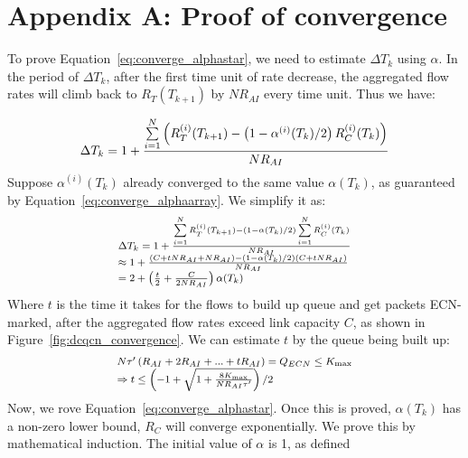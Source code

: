 \section*{Appendix A: Proof of convergence}
\label{sec:alpha_proof}
To prove Equation~\ref{eq:converge_alphastar}, we need to estimate $\Delta T_k$
using $\alpha$. In the period of $\Delta T_k$, after the first time unit of rate
decrease, the aggregated flow rates will climb back to $R_T(T_{k+1})$ by
$NR_{AI}$ every time unit.  Thus we have:

\begin{equation}
\small\Delta {T_k} = 1 + \frac{{\sum\limits_{i = 1}^N {\left( {R_T^{(i)}({T_{k + 1}}) - \left( {1 - {\alpha ^{(i)}}({T_k})/2} \right)R_C^{(i)}({T_k})} \right)} }}{{N{R_{AI}}}}
\end{equation}
Suppose $\alpha^{(i)}({T_k})$ already converged to the same value $\alpha ({T_k})$, as guaranteed by
Equation~\ref{eq:converge_alphaarray}. We simplify it as:
\begin{equation}
\small
\begin{array}{l}
\Delta {T_k} = 1 + \frac{{\sum\limits_{i = 1}^N {R_T^{(i)}({T_{k + 1}})}  - \left( {1 - \alpha ({T_k})/2} \right)\sum\limits_{i = 1}^N {R_C^{(i)}({T_k})} }}{{N{R_{AI}}}}\\
 \approx 1 + \frac{{\left( {C + tN{R_{AI}} + N{R_{AI}}} \right) - \left( {1 - \alpha ({T_k})/2} \right)\left( {C + tN{R_{AI}}} \right)}}{{N{R_{AI}}}}\\
 = 2 + \left( {\frac{t}{2} + \frac{C}{{2N{R_{AI}}}}} \right)\alpha ({T_k})
\end{array}
\label{eq:converge_tk}
\end{equation}
Where $t$ is the time it takes for the flows to build up queue and get packets ECN-marked, after
the aggregated flow rates exceed link capacity $C$, as shown in Figure~\ref{fig:dcqcn_convergence}.
We can estimate $t$ by the queue being built up:
\begin{equation}
\small
\begin{array}{l}
N\tau '\left( {{R_{AI}} + 2{R_{AI}} + ... + t{R_{AI}}} \right) = {Q_{ECN}} \le {K_{\max }}\\
 \Rightarrow t \le \left( { - 1 + \sqrt {1 + \frac{{8{K_{\max }}}}{{N{R_{AI}}\tau '}}} } \right)/2
\end{array}
\end{equation}
Now, we rove Equation~\ref{eq:converge_alphastar}.
Once this is proved, $\alpha ({T_k})$ has a non-zero lower bound, $R_C$ will converge exponentially.
We prove this by mathematical induction. The initial value of $\alpha$ is 1, as defined
